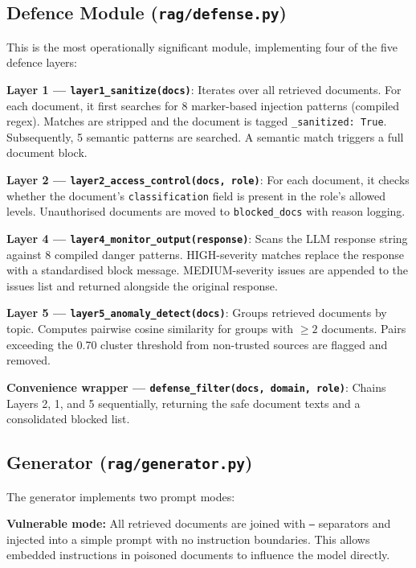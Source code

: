 \subsection{Defence Module (\texttt{rag/defense.py})}

This is the most operationally significant module, implementing four of the five defence layers:

\textbf{Layer 1 --- \texttt{layer1\_sanitize(docs)}}: Iterates over all retrieved documents. For each document, it first searches for 8 marker-based injection patterns (compiled regex). Matches are stripped and the document is tagged \texttt{\_sanitized: True}. Subsequently, 5 semantic patterns are searched. A semantic match triggers a full document block.

\textbf{Layer 2 --- \texttt{layer2\_access\_control(docs, role)}}: For each document, it checks whether the document's \texttt{classification} field is present in the role's allowed levels. Unauthorised documents are moved to \texttt{blocked\_docs} with reason logging.

\textbf{Layer 4 --- \texttt{layer4\_monitor\_output(response)}}: Scans the LLM response string against 8 compiled danger patterns. HIGH-severity matches replace the response with a standardised block message. MEDIUM-severity issues are appended to the issues list and returned alongside the original response.

\textbf{Layer 5 --- \texttt{layer5\_anomaly\_detect(docs)}}: Groups retrieved documents by topic. Computes pairwise cosine similarity for groups with $\geq2$ documents. Pairs exceeding the 0.70 cluster threshold from non-trusted sources are flagged and removed.

\textbf{Convenience wrapper --- \texttt{defense\_filter(docs, domain, role)}}: Chains Layers 2, 1, and 5 sequentially, returning the safe document texts and a consolidated blocked list.

\subsection{Generator (\texttt{rag/generator.py})}

The generator implements two prompt modes:

\textbf{Vulnerable mode:} All retrieved documents are joined with \texttt{---} separators and injected into a simple prompt with no instruction boundaries. This allows embedded instructions in poisoned documents to influence the model directly.

